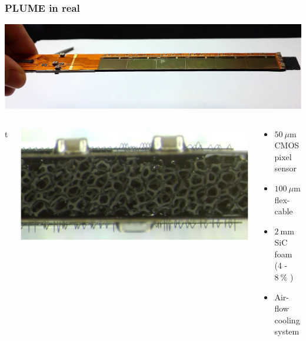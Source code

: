 \documentclass{beamer}
\begin{document}

\begin{frame}
  \frametitle{PLUME in real}

  \begin{center}
    \includegraphics[width = \textwidth]{Pictures/plume2.jpg}
  \end{center}
  
  \begin{columns}{t}
    \begin{column}{0.5\textwidth}
      \centering
      \includegraphics[width = \textwidth]{Pictures/SiC.png}
    \end{column}
    \begin{column}{0.5\textwidth}
      \begin{itemize}
        \item $50~\mu\text{m}$ CMOS pixel sensor
        \item $100~\mu\text{m}$ flex-cable
        \item $2~\text{mm}$ SiC foam (4 - $8~\%$ )
        \item Air-flow cooling system
      \end{itemize}
    \end{column}
  \end{columns}
\end{frame}

\end{document}
